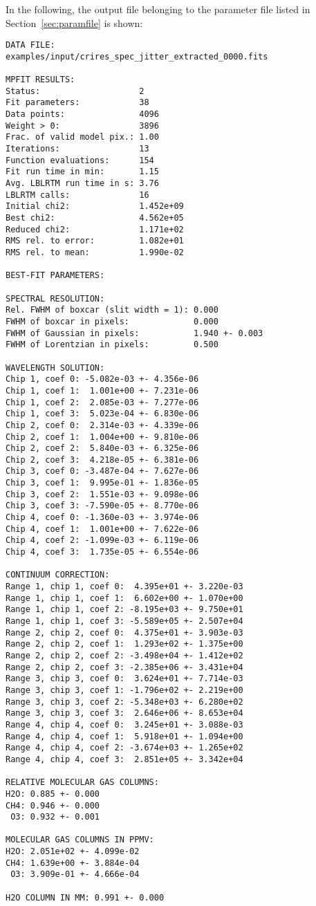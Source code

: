 In the following, the output file belonging to the parameter file listed in
Section~\ref{sec:paramfile} is shown:
\begin{verbatim}
DATA FILE:
examples/input/crires_spec_jitter_extracted_0000.fits

MPFIT RESULTS:
Status:                    2
Fit parameters:            38
Data points:               4096
Weight > 0:                3896
Frac. of valid model pix.: 1.00
Iterations:                13
Function evaluations:      154
Fit run time in min:       1.15
Avg. LBLRTM run time in s: 3.76
LBLRTM calls:              16
Initial chi2:              1.452e+09
Best chi2:                 4.562e+05
Reduced chi2:              1.171e+02
RMS rel. to error:         1.082e+01
RMS rel. to mean:          1.990e-02

BEST-FIT PARAMETERS:

SPECTRAL RESOLUTION:
Rel. FWHM of boxcar (slit width = 1): 0.000
FWHM of boxcar in pixels:             0.000
FWHM of Gaussian in pixels:           1.940 +- 0.003
FWHM of Lorentzian in pixels:         0.500

WAVELENGTH SOLUTION:
Chip 1, coef 0: -5.082e-03 +- 4.356e-06
Chip 1, coef 1:  1.001e+00 +- 7.231e-06
Chip 1, coef 2:  2.085e-03 +- 7.277e-06
Chip 1, coef 3:  5.023e-04 +- 6.830e-06
Chip 2, coef 0:  2.314e-03 +- 4.339e-06
Chip 2, coef 1:  1.004e+00 +- 9.810e-06
Chip 2, coef 2:  5.840e-03 +- 6.325e-06
Chip 2, coef 3:  4.218e-05 +- 6.381e-06
Chip 3, coef 0: -3.487e-04 +- 7.627e-06
Chip 3, coef 1:  9.995e-01 +- 1.836e-05
Chip 3, coef 2:  1.551e-03 +- 9.098e-06
Chip 3, coef 3: -7.590e-05 +- 8.770e-06
Chip 4, coef 0: -1.360e-03 +- 3.974e-06
Chip 4, coef 1:  1.001e+00 +- 7.622e-06
Chip 4, coef 2: -1.099e-03 +- 6.119e-06
Chip 4, coef 3:  1.735e-05 +- 6.554e-06

CONTINUUM CORRECTION:
Range 1, chip 1, coef 0:  4.395e+01 +- 3.220e-03
Range 1, chip 1, coef 1:  6.602e+00 +- 1.070e+00
Range 1, chip 1, coef 2: -8.195e+03 +- 9.750e+01
Range 1, chip 1, coef 3: -5.589e+05 +- 2.507e+04
Range 2, chip 2, coef 0:  4.375e+01 +- 3.903e-03
Range 2, chip 2, coef 1:  1.293e+02 +- 1.375e+00
Range 2, chip 2, coef 2: -3.498e+04 +- 1.412e+02
Range 2, chip 2, coef 3: -2.385e+06 +- 3.431e+04
Range 3, chip 3, coef 0:  3.624e+01 +- 7.714e-03
Range 3, chip 3, coef 1: -1.796e+02 +- 2.219e+00
Range 3, chip 3, coef 2: -5.348e+03 +- 6.280e+02
Range 3, chip 3, coef 3:  2.646e+06 +- 8.653e+04
Range 4, chip 4, coef 0:  3.245e+01 +- 3.088e-03
Range 4, chip 4, coef 1:  5.918e+01 +- 1.094e+00
Range 4, chip 4, coef 2: -3.674e+03 +- 1.265e+02
Range 4, chip 4, coef 3:  2.851e+05 +- 3.342e+04

RELATIVE MOLECULAR GAS COLUMNS:
H2O: 0.885 +- 0.000
CH4: 0.946 +- 0.000
 O3: 0.932 +- 0.001

MOLECULAR GAS COLUMNS IN PPMV:
H2O: 2.051e+02 +- 4.099e-02
CH4: 1.639e+00 +- 3.884e-04
 O3: 3.909e-01 +- 4.666e-04

H2O COLUMN IN MM: 0.991 +- 0.000
\end{verbatim}

